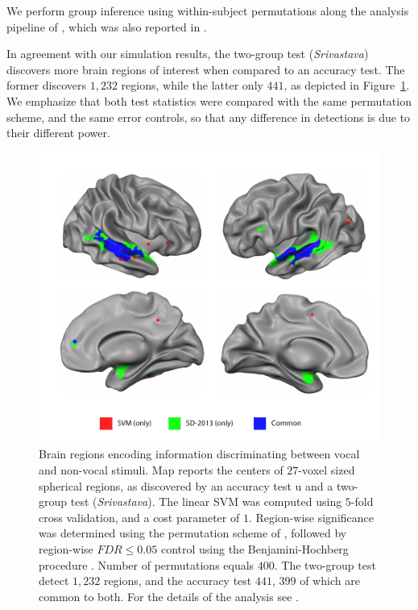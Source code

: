 \documentclass[onecolumn,draftclsnofoot]{IEEEtran}
\begin{document}
We perform group inference using within-subject permutations along the analysis pipeline of \cite{stelzer_statistical_2013}, which was also reported in \cite{gilron_quantifying_2016}. 

In agreement with our simulation results, the two-group test (\emph{Srivastava}) discovers more brain regions of interest when compared to an accuracy test.
The former discovers $1,232$ regions, while the latter only $441$, as depicted in Figure~\ref{fig:read_data}.
We emphasize that both test statistics were compared with the same permutation scheme, and the same error controls, so that any difference in detections is due to their different power.


\begin{figure}[th]
	\centering
	\includegraphics[width=1\columnwidth]{"art/svm_vs_SD"}
	\caption{\footnotesize
		Brain regions encoding information discriminating between vocal and non-vocal stimuli.
		Map reports the centers of $27$-voxel sized spherical regions, as discovered by an accuracy test u and a two-group test (\emph{Srivastava}). 
		The linear SVM was computed using $5$-fold cross validation, and a cost parameter of $1$. 
		Region-wise significance was determined using the permutation scheme of \cite{stelzer_statistical_2013}, followed by region-wise $FDR \leq 0.05$ control using the Benjamini-Hochberg procedure \cite{benjamini_controlling_1995}.
		Number of permutations equals $400$.
		The two-group test detect $1,232$ regions, and the accuracy test $441$, $399$ of which are common to both.
		For the details of the analysis see \cite{gilron_quantifying_2016}.  
	}
	\label{fig:read_data}
\end{figure}
\end{document}
